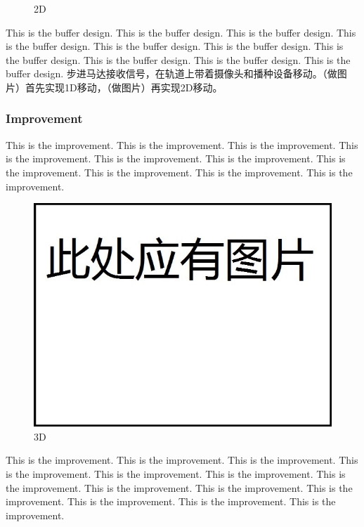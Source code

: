 \documentclass[12pt]{article}
\begin{document}
\begin{flushleft}
\begin{figure}[ht!]
\begin{center}
		\caption{2D}
	\end{center}
\end{figure}
This is the buffer design. This is the buffer design. This is the buffer design. This is the buffer design. This is the buffer design. This is the buffer design. This is the buffer design. This is the buffer design. This is the buffer design. This is the buffer design. 
步进马达接收信号，在轨道上带着摄像头和播种设备移动。（做图片）首先实现1D移动，（做图片）再实现2D移动。

\subsubsection{Improvement}
This is the improvement. This is the improvement. This is the improvement. This is the improvement. This is the improvement. This is the improvement. This is the improvement. This is the improvement. This is the improvement. This is the improvement. 
\begin{figure}[ht!]
	\begin{center}
		\includegraphics[scale = 0.6]{3D.jpg}
		\caption{3D}
	\end{center}
\end{figure}
This is the improvement. This is the improvement. This is the improvement. This is the improvement. This is the improvement. This is the improvement. This is the improvement. This is the improvement. This is the improvement. This is the improvement. This is the improvement. This is the improvement. This is the improvement. 
\begin{figure}[ht!]

\end{figure}
\end{flushleft}
\end{document}
